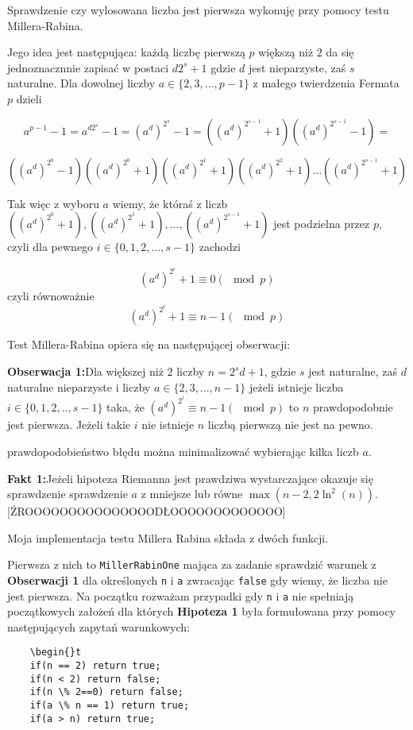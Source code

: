 \documentclass{article}
\begin{document}
Sprawdzenie czy wylosowana liczba jest pierwsza wykonuję przy pomocy testu Millera-Rabina. 

Jego idea jest następująca: każdą liczbę pierwszą $p$ większą niż $2$ da się jednoznacznnie zapisać w 
postaci $d2^s+1$
gdzie $d$ jest nieparzyste, zaś $s$ naturalne. Dla dowolnej liczby
$a \in \{2,3,...,p-1\}$ z małego twierdzenia Fermata $p$ dzieli

$$ a^{p-1}-1=a^{d2^s}-1=(a^d)^{2^s}-1=((a^d)^{2^{s-1}}+1)((a^d)^{2^{s-1}}-1)=$$


$$((a^d)^{2^0}-1)((a^d)^{2^0}+1)((a^d)^{2^1}+1)((a^d)^{2^2}+1)...((a^d)^{2^{s-1}}+1) $$

Tak więc z wyboru $a$ wiemy, że któraś z liczb  $((a^d)^{2^0}+1),((a^d)^{2^1}+1),...,((a^d)^{2^{s-1}}+1)$
jest podzielna przez $p$, czyli dla pewnego $i \in \{0,1,2,...,s-1\}$ zachodzi 

$$(a^d)^{2 ^i} + 1\equiv 0 (\mod p)$$
czyli równoważnie 
$$(a^d)^{2 ^i} + 1\equiv n-1 (\mod p)$$

Test Millera-Rabina opiera się na następującej obserwacji:
\begin{tcolorbox}
\textbf{Obserwacja 1:}Dla większej niż $2$ liczby $n=2^sd+1$, gdzie $s$ jest naturalne, zaś $d$ naturalne nieparzyste i liczby $
a \in \{2,3,...,n-1\}$
jeżeli istnieje liczba $i \in \{0,1,2,..,s-1\}$ taka, że $(a^d)^{2^i} \equiv n-1 (\mod p)$ to $n$
prawdopodobnie jest pierwsza. Jeżeli takie $i$ nie istnieje $n$ liczbą pierwszą nie jest na pewno.
\end{tcolorbox}

prawdopodobieństwo błędu można minimalizować wybierając kilka liczb $a$. 
\begin{tcolorbox}
    \textbf{Fakt 1:}Jeżeli hipoteza Riemanna jest 
    prawdziwa wystarczające okazuje się sprawdzenie sprawdzenie $a$ z mniejsze lub równe 
    $\max(n-2,2\ln^2(n))$.[ŹROOOOOOOOOOOOOOODŁOOOOOOOOOOOOO]
    
\end{tcolorbox}

Moja implementacja testu Millera Rabina składa z dwóch funkcji. 

Pierwsza z nich to \texttt{MillerRabinOne} mająca za zadanie sprawdzić warunek z \textbf{Obserwacji 1} dla określonych
\texttt{n} i \texttt{a} zwracając \texttt{false} gdy wiemy, że liczba nie jest pierwsza.
Na początku rozważam przypadki gdy \texttt{n} i \texttt{a} nie spełniają początkowych założeń dla których
\textbf{Hipoteza 1} była formułowana przy pomocy następujących zapytań warunkowych:
\begin{lstlisting}
    \begin{}t  
    if(n == 2) return true;
    if(n < 2) return false;
    if(n \% 2==0) return false;
    if(a \% n == 1) return true;
    if(a > n) return true;
\end{lstlisting}
\end{document}
